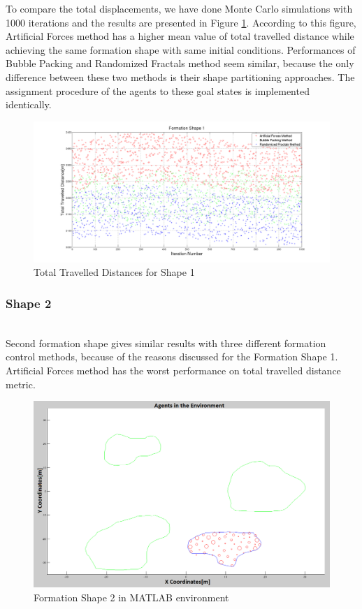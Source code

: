 To compare the total displacements, we have done Monte Carlo simulations with 1000 iterations and the results are presented in Figure \ref{total_disp_1}. According to this figure, Artificial Forces method has a higher mean value of total travelled distance while achieving the same formation shape with same initial conditions. Performances of Bubble Packing and Randomized Fractals method seem similar, because the only difference between these two methods is their shape partitioning approaches. The assignment procedure of the agents to these goal states is implemented identically. 
		
\begin{figure}[H]
\caption{Total Travelled Distances for Shape 1} \label{total_disp_1}
\centerline{\includegraphics[scale = 0.32]{Total_Energy_Shape_1}}
\end{figure} 	
				
\subsubsection{Shape 2}\hspace{0pt} \\
Second formation shape gives similar results with three different formation control methods, because of the reasons discussed for the Formation Shape 1. Artificial Forces method has the worst performance on total travelled distance metric. 

\begin{figure}[H]
\caption{Formation Shape 2 in MATLAB environment}
\centerline{\includegraphics[scale = 0.32]{Trajectories_Formation_Shape_2_2}}
\end{figure} 	
		   
